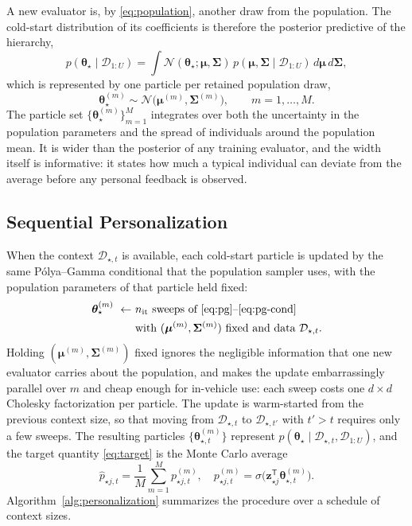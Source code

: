 \documentclass[lettersize,journal]{IEEEtran}
\newcommand{\Normal}{\mathcal{N}}
\newcommand{\sigmoid}{\sigma}
\newcommand{\T}{\mathsf{T}}
\newcommand{\D}{\mathcal{D}}
\newcommand{\newuser}{\star}
\begin{document}
A new evaluator is, by \eqref{eq:population}, another draw from the population. The cold-start distribution of its coefficients is therefore the posterior predictive of the hierarchy,
\begin{equation}
 p(\bm\theta_{\newuser}\mid\D_{1:U})=\int\Normal(\bm\theta_{\newuser};\bm\mu,\bm\Sigma)\,p(\bm\mu,\bm\Sigma\mid\D_{1:U})\,d\bm\mu\,d\bm\Sigma,
\end{equation}
which is represented by one particle per retained population draw,
\begin{equation}
 \bm\theta_{\newuser}^{(m)}\sim\Normal\!\big(\bm\mu^{(m)},\bm\Sigma^{(m)}\big),\qquad m=1,\ldots,M.
 \label{eq:coldstart}
\end{equation}
The particle set $\{\bm\theta_{\newuser}^{(m)}\}_{m=1}^{M}$ integrates over both the uncertainty in the population parameters and the spread of individuals around the population mean. It is wider than the posterior of any training evaluator, and the width itself is informative: it states how much a typical individual can deviate from the average before any personal feedback is observed.

\subsection{Sequential Personalization}
\label{sec:personalization}

When the context $\D_{\newuser,t}$ is available, each cold-start particle is updated by the same P\'{o}lya--Gamma conditional that the population sampler uses, with the population parameters of that particle held fixed:
\begin{equation}
\begin{split}
 \bm\theta_{\newuser}^{(m)}\ \leftarrow\ &\text{$n_{\mathrm{it}}$ sweeps of \eqref{eq:pg}--\eqref{eq:pg-cond}}\\
 &\text{with } (\bm\mu^{(m)},\bm\Sigma^{(m)})\text{ fixed and data }\D_{\newuser,t}.
\end{split}
 \label{eq:personalize}
\end{equation}
Holding $(\bm\mu^{(m)},\bm\Sigma^{(m)})$ fixed ignores the negligible information that one new evaluator carries about the population, and makes the update embarrassingly parallel over $m$ and cheap enough for in-vehicle use: each sweep costs one $d\times d$ Cholesky factorization per particle. The update is warm-started from the previous context size, so that moving from $\D_{\newuser,t}$ to $\D_{\newuser,t'}$ with $t'>t$ requires only a few sweeps. The resulting particles $\{\bm\theta^{(m)}_{\newuser,t}\}$ represent $p(\bm\theta_{\newuser}\mid\D_{\newuser,t},\D_{1:U})$, and the target quantity \eqref{eq:target} is the Monte Carlo average
\begin{equation}
 \widehat p_{\newuser j,t}=\frac{1}{M}\sum_{m=1}^{M}p^{(m)}_{\newuser j,t},\quad
 p^{(m)}_{\newuser j,t}=\sigmoid\!\big(\bm z_{\newuser j}^{\T}\bm\theta^{(m)}_{\newuser,t}\big).
 \label{eq:prediction}
\end{equation}
Algorithm~\ref{alg:personalization} summarizes the procedure over a schedule of context sizes.
\end{document}

